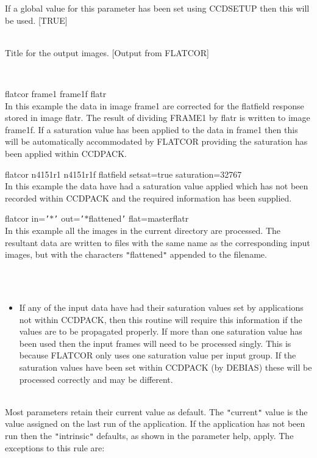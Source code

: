 \documentclass[twoside,11pt]{article}
\newcommand{\htmlref}[2]{#1}
\renewcommand{\_}{\texttt{\symbol{95}}}
\newcommand{\qt}[1]{{\tt "}#1{\tt "}}
\newcommand{\qs}[1]{{\tt '}#1{\tt '}}
\newcommand{\routine}[1]{{\sc #1}}
\newcommand{\xroutine}[1]{\htmlref{{\sc #1}}{#1}}
\newcommand{\sstexamples}[1]{
   \item[Examples:] \mbox{} \\
   \vspace{-3.5ex}
   \begin{description}
      #1
   \end{description}
}
\newcommand{\sstsubsection}[1]{ \item[{#1}] \mbox{} \\}
\newcommand{\sstexamplesubsection}[2]{\sloppy \item{\ssttt #1} \mbox{} \\ #2 }
\newcommand{\sstnotes}[1]{\item[Notes:] \mbox{} \\[1.3ex] #1}
\newcommand{\sstdiytopic}[2]{\item[#1:] \mbox{} \\[1.3ex] #2}
\newcommand{\sstitemlist}[1]{
  \mbox{} \\
  \vspace{-3.5ex}
  \begin{itemize}
     #1
  \end{itemize}
}
\newcommand{\sstitem}{\item}
\newcommand{\sstexamples}[1]{
      \item[Examples:] \\
      \begin{description}
         #1
      \end{description}
      \\
   }
\newcommand{\sstsubsection}[1]{\item[{#1}]}
\newcommand{\sstexamplesubsection}[2]{\item[{\ssttt #1}] #2}
\newcommand{\sstnotes}[1]{\item[Notes:] #1 }
\newcommand{\sstdiytopic}[2]{\item[{#1}] #2 }
\newcommand{\sstitemlist}[1]{
      \begin{itemize}
         #1
      \end{itemize}
      \\
   }
\newcommand{\sstitem}{\item}
\begin{document}
{{{         If a global value for this parameter has been set using
         \xroutine{CCDSETUP} then this will be used.
         [TRUE]
      }
      \sstsubsection{
         TITLE = LITERAL (Read)
      } {
         Title for the output images.
         [Output from FLATCOR]
      }
   }
   \sstexamples{
      \sstexamplesubsection{
         flatcor frame1 frame1\_f flatr
      } {
         In this example the data in image frame1 are corrected for the
         flatfield response stored in image flatr. The result of dividing
         FRAME1 by flatr is written to image frame1\_f. If a saturation
         value has been applied to the data in frame1 then this will be
         automatically accommodated by \routine{FLATCOR} providing the saturation
         has been applied within CCDPACK.
      }
      \sstexamplesubsection{
         flatcor n4151r1 n4151r1f flatfield setsat=true saturation=32767
      } {
         In this example the data have had a saturation value applied
         which has not been recorded within CCDPACK and the required
         information has been supplied.
      }
      \sstexamplesubsection{
         flatcor in=\qs{$*$} out=\qs{$*$\_flattened} flat=master\_flatr
      } {
         In this example all the images in the current directory are
         processed. The resultant data are written to files with the
         same name as the corresponding input images, but with the
         characters \qt{\_flattened} appended to the filename.
      }
   }
   \sstnotes{
      \sstitemlist{

         \sstitem
         If any of the input data have had their saturation values set by
           applications not within CCDPACK, then this routine will require
           this information if the values are to be propagated properly. If
           more than one saturation value has been used then the input
           frames will need to be processed singly. This is because \routine{FLATCOR}
           only uses one saturation value per input group. If the
           saturation values have been set within CCDPACK (by \xroutine{DEBIAS})
           these will be processed correctly and may be different.
      }
   }
   \sstdiytopic{
      Behaviour of parameters
   } {
      Most parameters retain their current value as default. The
      \qt{current} value is the value assigned on the last run of the
      application. If the application has not been run then the
      \qt{intrinsic} defaults, as shown in the parameter help, apply.
      The exceptions to this rule are:
      \sstitemlist{

}}}
\end{document}
